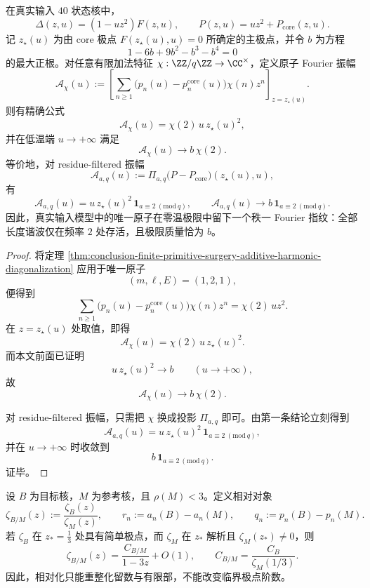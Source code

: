 \begin{corollary}\label{cor:conclusion-realinput40-atomic-fourier-fingerprint}
在真实输入 \(40\) 状态核中，
\[
\Delta(z,u)=(1-uz^2)F(z,u),
\qquad
P(z,u)=uz^2+P_{\mathrm{core}}(z,u).
\]
记 \(z_\star(u)\) 为由 core 极点 \(F(z_\star(u),u)=0\) 所确定的主极点，并令 \(b\) 为方程
\[
1-6b+9b^2-b^3-b^4=0
\]
的最大正根。对任意有限加法特征 \(\chi:\ZZ/q\ZZ\to \CC^\times\)，定义原子 Fourier 振幅
\[
\mathcal A_\chi(u)
:=
\left[\sum_{n\ge 1}\bigl(p_n(u)-p_n^{\mathrm{core}}(u)\bigr)\chi(n)z^n\right]_{z=z_\star(u)}.
\]
则有精确公式
\[
\mathcal A_\chi(u)=\chi(2)\,u\,z_\star(u)^2,
\]
并在低温端 \(u\to +\infty\) 满足
\[
\mathcal A_\chi(u)\longrightarrow b\,\chi(2).
\]
等价地，对 residue-filtered 振幅
\[
\mathcal A_{a,q}(u):=
\Pi_{a,q}\!\bigl(P-P_{\mathrm{core}}\bigr)(z_\star(u),u),
\]
有
\[
\mathcal A_{a,q}(u)=u\,z_\star(u)^2\,\mathbf 1_{a\equiv 2\ (\mathrm{mod}\ q)},
\qquad
\mathcal A_{a,q}(u)\longrightarrow b\,\mathbf 1_{a\equiv 2\ (\mathrm{mod}\ q)}.
\]
因此，真实输入模型中的唯一原子在零温极限中留下一个秩一 Fourier 指纹：全部长度谐波仅在频率 \(2\) 处存活，且极限质量恰为 \(b\)。
\end{corollary}
\begin{proof}
将定理 \ref{thm:conclusion-finite-primitive-surgery-additive-harmonic-diagonalization} 应用于唯一原子
\[
(m,\ell,E)=(1,2,1),
\]
便得到
\[
\sum_{n\ge 1}\bigl(p_n(u)-p_n^{\mathrm{core}}(u)\bigr)\chi(n)z^n
=
\chi(2)\,u z^2.
\]
在 \(z=z_\star(u)\) 处取值，即得
\[
\mathcal A_\chi(u)=\chi(2)\,u\,z_\star(u)^2.
\]
而本文前面已证明
\[
u\,z_\star(u)^2\longrightarrow b
\qquad
(u\to +\infty),
\]
故
\[
\mathcal A_\chi(u)\longrightarrow b\,\chi(2).
\]

对 residue-filtered 振幅，只需把 \(\chi\) 换成投影 \(\Pi_{a,q}\) 即可。由第一条结论立刻得到
\[
\mathcal A_{a,q}(u)
=
u\,z_\star(u)^2\,\mathbf 1_{a\equiv 2\ (\mathrm{mod}\ q)},
\]
并在 \(u\to+\infty\) 时收敛到
\[
b\,\mathbf 1_{a\equiv 2\ (\mathrm{mod}\ q)}.
\]
证毕。
\end{proof}

\begin{theorem}\label{thm:conclusion-relative-zeta-quotient-critical-order-invariance}
设 \(B\) 为目标核，\(M\) 为参考核，且 \(\rho(M)<3\)。定义相对对象
\[
\zeta_{B/M}(z):=\frac{\zeta_B(z)}{\zeta_M(z)},
\qquad
r_n:=a_n(B)-a_n(M),
\qquad
q_n:=p_n(B)-p_n(M).
\]
若 \(\zeta_B\) 在 \(z_\ast=\frac13\) 处具有简单极点，而 \(\zeta_M\) 在 \(z_\ast\) 解析且 \(\zeta_M(z_\ast)\neq 0\)，则
\[
\zeta_{B/M}(z)=\frac{C_{B/M}}{1-3z}+O(1),
\qquad
C_{B/M}=\frac{C_B}{\zeta_M(1/3)}.
\]
因此，相对化只能重整化留数与有限部，不能改变临界极点阶数。
\end{theorem}


